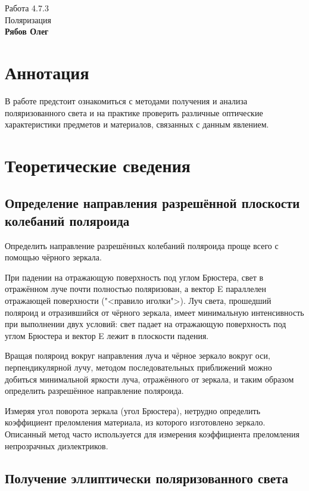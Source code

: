 \documentclass[a4paper,12pt]{article}
\begin{document}
\begin{center}
  \LARGE{Работа 4.7.3}\\[0.2cm]
  \vspace{10pt}
  \LARGE{Поляризация}\\[0.2cm]
  \vspace{10pt}
  \large{\bf Рябов Олег}\\[0.2cm]
\end{center}  
  

\section{Аннотация}
	В работе предстоит ознакомиться с методами получения и анализа поляризованного света и на практике проверить различные оптические характеристики предметов и материалов, связанных с данным явлением.
	
\section{Теоретические сведения}

\subsection{Определение направления разрешённой плоскости колебаний поляроида}
	
	Определить направление разрешённых колебаний поляроида проще всего с помощью чёрного зеркала.
	
При падении на отражающую поверхность под углом Брюстера, свет в отражённом луче почти полностью поляризован, а вектор E параллелен отражающей поверхности ("<правило иголки">). Луч света, прошедший поляроид и отразившийся от чёрного зеркала, имеет минимальную интенсивность при выполнении двух условий: свет падает на отражающую поверхность под углом Брюстера и вектор E лежит в плоскости падения.

Вращая поляроид вокруг направления луча и чёрное зеркало вокруг оси, перпендикулярной лучу, методом последовательных приближений можно добиться минимальной яркости луча, отражённого от зеркала, и таким образом определить разрешённое направление поляроида.

Измеряя угол поворота зеркала (угол Брюстера), нетрудно определить коэффициент преломления материала, из которого изготовлено зеркало. Описанный метод часто используется для измерения коэффициента преломления непрозрачных диэлектриков.

\subsection{Получение эллиптически поляризованного света}
\end{document}
